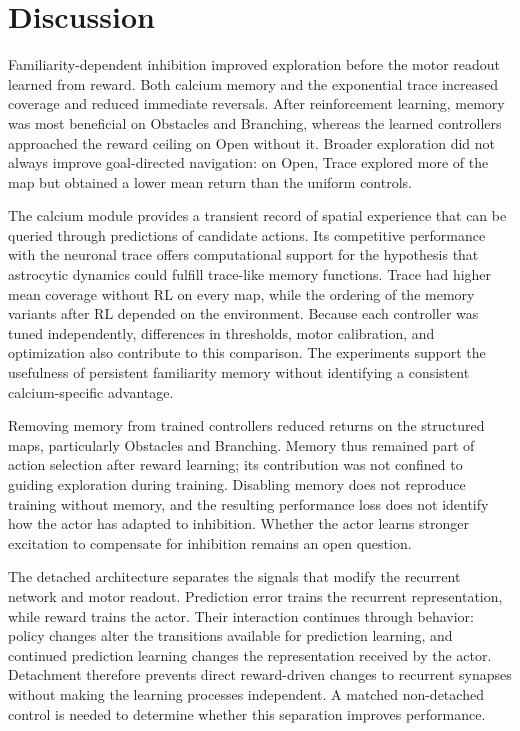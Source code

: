 \section{Discussion}
Familiarity-dependent inhibition improved exploration before the motor readout learned from reward. Both calcium memory and the exponential trace increased coverage and reduced immediate reversals. After reinforcement learning, memory was most beneficial on Obstacles and Branching, whereas the learned controllers approached the reward ceiling on Open without it. Broader exploration did not always improve goal-directed navigation: on Open, Trace explored more of the map but obtained a lower mean return than the uniform controls.

The calcium module provides a transient record of spatial experience that can be queried through predictions of candidate actions. Its competitive performance with the neuronal trace offers computational support for the hypothesis that astrocytic dynamics could fulfill trace-like memory functions. Trace had higher mean coverage without RL on every map, while the ordering of the memory variants after RL depended on the environment. Because each controller was tuned independently, differences in thresholds, motor calibration, and optimization also contribute to this comparison. The experiments support the usefulness of persistent familiarity memory without identifying a consistent calcium-specific advantage.

Removing memory from trained controllers reduced returns on the structured maps, particularly Obstacles and Branching. Memory thus remained part of action selection after reward learning; its contribution was not confined to guiding exploration during training. Disabling memory does not reproduce training without memory, and the resulting performance loss does not identify how the actor has adapted to inhibition. Whether the actor learns stronger excitation to compensate for inhibition remains an open question.

The detached architecture separates the signals that modify the recurrent network and motor readout. Prediction error trains the recurrent representation, while reward trains the actor. Their interaction continues through behavior: policy changes alter the transitions available for prediction learning, and continued prediction learning changes the representation received by the actor. Detachment therefore prevents direct reward-driven changes to recurrent synapses without making the learning processes independent. A matched non-detached control is needed to determine whether this separation improves performance.

